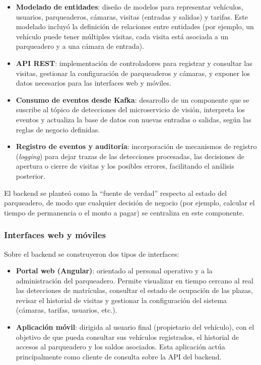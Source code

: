 \begin{itemize}
    \item \textbf{Modelado de entidades}: diseño de modelos para representar vehículos, usuarios, parqueaderos, cámaras, visitas (entradas y salidas) y tarifas. Este modelado incluyó la definición de relaciones entre entidades (por ejemplo, un vehículo puede tener múltiples visitas, cada visita está asociada a un parqueadero y a una cámara de entrada).
    \item \textbf{API REST}: implementación de controladores para registrar y consultar las visitas, gestionar la configuración de parqueaderos y cámaras, y exponer los datos necesarios para las interfaces web y móviles.
    \item \textbf{Consumo de eventos desde Kafka}: desarrollo de un componente que se suscribe al tópico de detecciones del microservicio de visión, interpreta los eventos y actualiza la base de datos con nuevas entradas o salidas, según las reglas de negocio definidas.
    \item \textbf{Registro de eventos y auditoría}: incorporación de mecanismos de registro (\textit{logging}) para dejar trazas de las detecciones procesadas, las decisiones de apertura o cierre de visitas y los posibles errores, facilitando el análisis posterior.
\end{itemize}

El backend se planteó como la “fuente de verdad” respecto al estado del parqueadero, de modo que cualquier decisión de negocio (por ejemplo, calcular el tiempo de permanencia o el monto a pagar) se centraliza en este componente.

\subsubsection{Interfaces web y móviles}

Sobre el backend se construyeron dos tipos de interfaces:

\begin{itemize}
    \item \textbf{Portal web (Angular)}: orientado al personal operativo y a la administración del parqueadero. Permite visualizar en tiempo cercano al real las detecciones de matrículas, consultar el estado de ocupación de las plazas, revisar el historial de visitas y gestionar la configuración del sistema (cámaras, tarifas, usuarios, etc.).
    \item \textbf{Aplicación móvil}: dirigida al usuario final (propietario del vehículo), con el objetivo de que pueda consultar sus vehículos registrados, el historial de accesos al parqueadero y los saldos asociados. Esta aplicación actúa principalmente como cliente de consulta sobre la API del backend.
\end{itemize}

